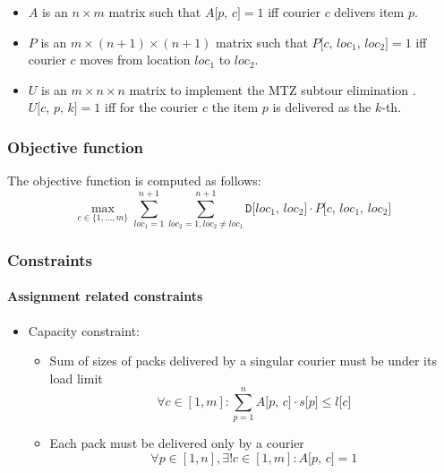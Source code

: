 \begin{itemize}
    \item $A$ is an $n \times m$ matrix such that $A\texttt{[$p$, $c$]} = 1$ iff courier $c$ delivers item $p$.

    \item $P$ is an $m \times (n+1) \times (n+1)$ matrix such that $P\texttt{[$c$, $loc_1$, $loc_2$]} = 1$ iff courier $c$ moves from location $loc_1$ to $loc_2$.

    \item $U$ is an $m \times n \times n$ matrix to implement the MTZ subtour elimination \cite{mtz_subtour}. $U\texttt{[$c$, $p$, $k$]} = 1$ iff for the courier $c$ the item $p$ is delivered as the $k$-th.
\end{itemize}

\subsubsection{Objective function}

The objective function is computed as follows:
\begin{equation}
    \label{eq:obj_fun}
    \max_{c \in \{ 1, \dots, m \}}
    \sum_{loc_1=1}^{n+1} \sum_{loc_2=1, loc_2 \neq loc_1}^{n+1} \texttt{D[$loc_1$, $loc_2$]} \cdot P\texttt{[$c$, $loc_1$, $loc_2$]}
\end{equation}


\subsubsection{Constraints}

\paragraph*{Assignment related constraints}

\begin{itemize}
    \item Capacity constraint:
    \begin{itemize}
        \item Sum of sizes of packs delivered by a singular courier must be under its load limit
        \begin{equation}
            \label{eq:capacity1}
            \forall c \in [1, m]:
            \sum_{p=1}^{n} A\texttt{[$p$, $c$]} \cdot s\texttt{[$p$]} \leq \texttt{$l$[$c$]}
        \end{equation}
        \item Each pack must be delivered only by a courier
        \begin{equation}
            \label{eq:capacity2}
            \forall p \in [1, n], \exists! c \in [1, m]: A\texttt{[$p$, $c$]} = 1
        \end{equation}
    \end{itemize}
\end{itemize}

